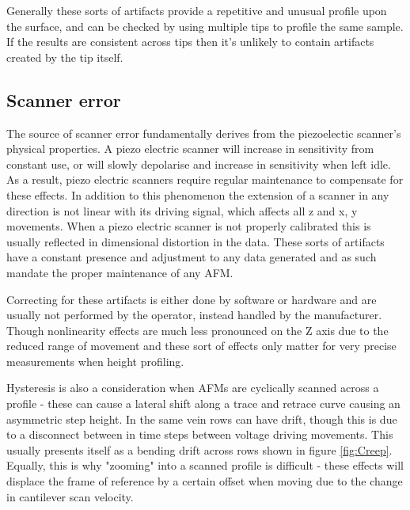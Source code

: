 Generally these sorts of artifacts provide a repetitive and unusual profile upon the surface, and can be checked by using multiple tips to profile the same sample. If the results are consistent across tips then it's unlikely to contain artifacts created by the tip itself.

\subsection{Scanner error}

The source of scanner error fundamentally derives from the piezoelectic scanner's physical properties. A piezo electric scanner will increase in sensitivity from constant use, or will slowly depolarise and increase in sensitivity when left idle. As a result, piezo electric scanners require regular maintenance to compensate for these effects. In addition to this phenomenon the extension of a scanner in any direction is not linear with its driving signal, which affects all z and x, y movements. When a piezo electric scanner is not properly calibrated this is usually reflected in dimensional distortion in the data. These sorts of artifacts have a constant presence and adjustment to any data generated and as such mandate the proper maintenance of any AFM. 

Correcting for these artifacts is either done by software or hardware and are usually not performed by the operator, instead handled by the manufacturer. Though nonlinearity effects are much less pronounced on the Z axis due to the reduced range of movement and these sort of effects only matter for very precise measurements when height profiling. 

Hysteresis is also a consideration when AFMs are cyclically scanned across a profile - these can cause a lateral shift along a trace and retrace curve causing an asymmetric step height. In the same vein rows can have drift, though this is due to a disconnect between in time steps between voltage driving movements. This usually presents itself as a bending drift across rows shown in figure \ref{fig:Creep}. Equally, this is why "zooming" into a scanned profile is difficult - these effects will displace the frame of reference by a certain offset when moving due to the change in cantilever scan velocity. 

